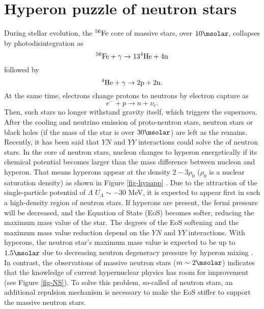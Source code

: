 \section{Hyperon puzzle of neutron stars}
During stellar evolution, the $\rm{^{56}Fe}$ core of massive stars, over $10\msolar$, collapses by photodisintegration as 
\begin{equation}
  \rm{^{56}Fe} + \gamma \to 13\rm{^4He} + 4n 
\end{equation}
followed by 
\begin{equation}
  \rm{^4He} + \gamma \to 2p + 2n.
\end{equation}
At the same time, electrons change protons to neutrons by electron capture as 
\begin{equation}
  e^- + p \to n + \nu_e.
\end{equation}
Then, such stars no longer withstand gravity itself, which triggers the supernova. After the cooling and neutrino emission of proto-neutron stars, neutron stars or black holes (if the mass of the star is over $30 \msolar$) are left as the remains. 
Recently, it has been said that $YN$ and $YY$ interactions could solve the  of neutron stars. In the core of neutron stars, nucleon changes to hyperon energetically if its chemical potential becomes larger than the mass difference between nucleon and hyperon. That means hyperons appear at the density $2-3 \rho_0$ ($\rho_0$ is a nuclear saturation density) as shown in Figure \ref{fig-hypapp} \cite{RMF-2008}. Due to the attraction of the single-particle potential of $\Lambda$ $U_\Lambda\sim-30$ MeV, it is expected to appear first in such a high-density region of neutron stars. If hyperons are present, the fermi pressure will be decreased, and the Equation of State (EoS) becomes softer, reducing the maximum mass value of the star. The degrees of the EoS softening and the maximum mass value reduction depend on the $YN$ and $YY$ interactions.
With hyperons, the neutron star's maximum mass value is expected to be up to $1.5\msolar$ due to decreasing neutron degeneracy pressure by hyperon mixing \cite{BHF-2008}. In contrast, the observations of massive neutron stars ($m\sim2\msolar$) \cite{NS-1} \cite{NS-2} indicates that the knowledge of current hypernuclear physics has room for improvement (see Figure \ref{fig-NS}). To solve this problem, so-called  of neutron stars, an additional repulsion mechanism is necessary to make the EoS stiffer to support the massive neutron stars. 

